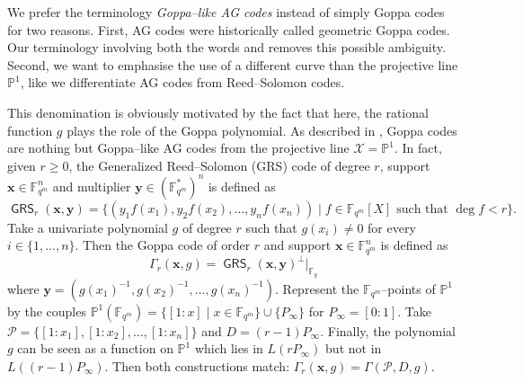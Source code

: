 \documentclass[a4paper]{article}
\theoremstyle{definition}
\theoremstyle{remark}
\newcommand{\calP}{\mathcal{P}}
\newcommand{\calX}{\mathcal{X}}
\newcommand{\fqm}{\mathbb{F}_{q^m}}
\newcommand{\fq}{\mathbb{F}_{q}}
\newcommand{\PP}{\mathbb{P}}
\newcommand{\GRS}{\operatorname{\mathsf{GRS}}}
\begin{document}
\medskip

We prefer the terminology \emph{Goppa--like AG codes} instead of simply Goppa codes for two reasons. First, AG codes were historically called geometric Goppa codes. Our terminology involving both the words  and  removes this possible ambiguity. Second, we want to emphasise the use of a different curve than the projective line $\PP^1$, like we differentiate AG codes from Reed--Solomon codes.

This denomination is obviously motivated by the fact that here, the rational function $g$ plays the role of the Goppa polynomial. As described in \cite[Example~9.1.8]{Sti09}, Goppa codes are nothing but Goppa--like AG codes from the projective line $\calX=\PP^1$. In fact, given $r \geq 0$, the Generalized Reed--Solomon (GRS) code of degree $r$, support $\mathbf{x} \in \fqm^n$ and multiplier $\mathbf{y} \in (\fqm^*)^n$ is defined as
\[\GRS_r(\mathbf{x},\mathbf{y})=\{(y_1f(x_1),y_2f(x_2),\dots,y_nf(x_n)) \mid f \in \fqm[X] \text{ such that } \deg f < r \}.\]
Take a univariate polynomial $g$ of degree $r$ such that $g(x_i) \neq 0$ for every  $i \in \{1,\dots,n\}$. Then the Goppa code of order $r$ and support $\mathbf{x} \in \fqm^n$ is defined as
\[\Gamma_r(\mathbf{x},g)= \GRS_r(\mathbf{x},\mathbf{y})^\perp|_{\fq}\]
where $\mathbf{y}=(g(x_1)^{-1},g(x_2)^{-1},\dots,g(x_n)^{-1})$.
Represent the $\fqm$--points of $\PP^1$ by the couples $\PP^1(\fqm)=\{[1:x] \mid x \in \fqm\} \cup \{P_\infty\}$ for $P_\infty=[0:1]$. Take $\calP=\{[1:x_1],[1:x_2],\dots,[1:x_n]\}$ and $D=(r-1)P_\infty$. Finally, the polynomial $g$ can be seen as a function on $\PP^1$ which lies in $L(rP_\infty)$ but not in $L((r-1)P_\infty)$. Then both constructions match: $\Gamma_r(\mathbf{x},g)=\Gamma(\calP,D,g)$.
\end{document}
